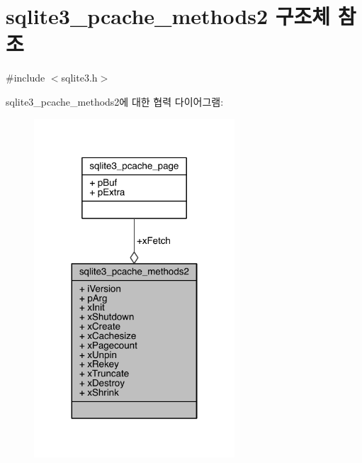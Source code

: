 \hypertarget{structsqlite3__pcache__methods2}{}\section{sqlite3\+\_\+pcache\+\_\+methods2 구조체 참조}
\label{structsqlite3__pcache__methods2}


{\ttfamily \#include $<$sqlite3.\+h$>$}



sqlite3\+\_\+pcache\+\_\+methods2에 대한 협력 다이어그램\+:
\nopagebreak
\begin{figure}[H]
\begin{center}
\leavevmode
\includegraphics[width=212pt]{db/d71/structsqlite3__pcache__methods2__coll__graph}
\end{center}
\end{figure}
